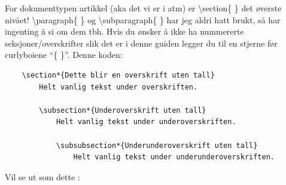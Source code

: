     For dokumenttypen artikkel (aka det vi er i atm) er \textbackslash section\{ \} det øverste nivået! \textbackslash paragraph\{ \} og \textbackslash subparagraph\{ \} har jeg aldri hatt brukt, så har ingenting å si om dem tbh. 
    Hvis du ønsker å ikke ha nummererte seksjoner/overskrifter slik det er i denne guiden legger du til en stjerne før curlyboiene ``\{ \}''.
    Denne koden: 
    \begin{verbatim}
    \section*{Dette blir en overskrift uten tall}
        Helt vanlig tekst under overskriften.
        
        \subsection*{Underoverskrift uten tall}
            Helt vanlig tekst under underoverskriften.
            
            \subsubsection*{Underunderoverskrift uten tall}
                Helt vanlig tekst under underunderoverskriften.
    \end{verbatim}
    
    Vil se ut som dette :
    \section*{}
        
        \subsection*{}
            
            \subsubsection*{}
    
    

